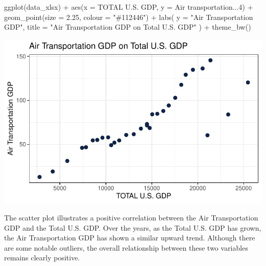 \documentclass[
  letterpaper,
  DIV=11,
  numbers=noendperiod]{scrreprt}
\newenvironment{Shaded}{\begin{snugshade}}{\end{snugshade}}
\newcommand{\AttributeTok}[1]{\textcolor[rgb]{0.40,0.45,0.13}{#1}}
\newcommand{\FloatTok}[1]{\textcolor[rgb]{0.68,0.00,0.00}{#1}}
\newcommand{\FunctionTok}[1]{\textcolor[rgb]{0.28,0.35,0.67}{#1}}
\newcommand{\NormalTok}[1]{\textcolor[rgb]{0.00,0.23,0.31}{#1}}
\newcommand{\SpecialCharTok}[1]{\textcolor[rgb]{0.37,0.37,0.37}{#1}}
\newcommand{\StringTok}[1]{\textcolor[rgb]{0.13,0.47,0.30}{#1}}
\begin{document}
\begin{Shaded}
\begin{Highlighting}[]
\FunctionTok{ggplot}\NormalTok{(data\_xlsx) }\SpecialCharTok{+}
  \FunctionTok{aes}\NormalTok{(}\AttributeTok{x =} \StringTok{\textasciigrave{}}\AttributeTok{TOTAL U.S. GDP}\StringTok{\textasciigrave{}}\NormalTok{, }\AttributeTok{y =} \StringTok{\textasciigrave{}}\AttributeTok{Air transportation...4}\StringTok{\textasciigrave{}}\NormalTok{) }\SpecialCharTok{+}
  \FunctionTok{geom\_point}\NormalTok{(}\AttributeTok{size =} \FloatTok{2.25}\NormalTok{, }\AttributeTok{colour =} \StringTok{"\#112446"}\NormalTok{) }\SpecialCharTok{+}
  \FunctionTok{labs}\NormalTok{(}
    \AttributeTok{y =} \StringTok{"Air Transportation GDP"}\NormalTok{,}
    \AttributeTok{title =} \StringTok{"Air Transportation GDP on Total U.S. GDP"}
\NormalTok{  ) }\SpecialCharTok{+}
  \FunctionTok{theme\_bw}\NormalTok{()}
\end{Highlighting}
\end{Shaded}

\includegraphics{FinalProject_Caleb_files/figure-pdf/unnamed-chunk-2-1.pdf}

The scatter plot illustrates a positive correlation between the Air
Transportation GDP and the Total U.S. GDP. Over the years, as the Total
U.S. GDP has grown, the Air Transportation GDP has shown a similar
upward trend. Although there are some notable outliers, the overall
relationship between these two variables remains clearly positive.
\end{document}

